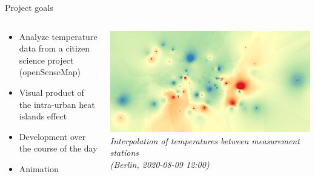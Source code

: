 \begin{frame}{Project goals}
\begin{columns}[T] %
	\begin{column}{.56\textwidth}
		\begin{itemize}
			\item Analyze temperature data from a citizen science project (openSenseMap)
			\item Visual product of the intra-urban heat islands effect
			\item Development over the course of the day
			\item Animation
		\end{itemize}
	\end{column}%
	\hfill%
	\begin{column}{.44\textwidth}
		\includegraphics[width=\linewidth]{../writeup/images/interpolation_idw.png}\\
		\textit{\footnotesize Interpolation of temperatures between measurement stations\\(Berlin, 2020-08-09 12:00)}
	\end{column}%
\end{columns}
\end{frame}
